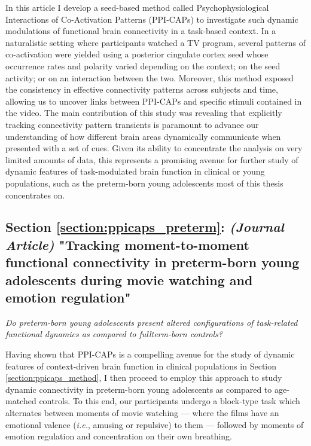 In this article I develop a seed-based method called Psychophysiological Interactions of Co-Activation Patterns (PPI-CAPs) to investigate such dynamic modulations of functional brain connectivity in a task-based context. In a naturalistic setting where participants watched a TV program, several patterns of co-activation were yielded using a posterior cingulate cortex seed whose occurrence rates and polarity varied depending on the context; on the seed activity; or on an interaction between the two. Moreover, this method exposed the consistency in effective connectivity patterns across subjects and time, allowing us to uncover links between PPI-CAPs and specific stimuli contained in the video. The main contribution of this study was revealing that explicitly tracking connectivity pattern transients is paramount to advance our understanding of how different brain areas dynamically communicate when presented with a set of cues. Given its ability to concentrate the analysis on very limited amounts of data, this represents a promising avenue for further study of dynamic features of task-modulated brain function in clinical or young populations, such as the preterm-born young adolescents most of this thesis concentrates on. 


\subsection*{Section \ref{section:ppicaps_preterm}: \textit{(Journal Article)} "Tracking moment-to-moment functional connectivity in preterm-born young adolescents during movie watching and emotion regulation"}
\textit{Do preterm-born young adolescents present altered configurations of task-related functional dynamics as compared to fullterm-born controls?}

Having shown that PPI-CAPs is a compelling avenue for the study of dynamic features of context-driven brain function in clinical populations \citep{Freitas2020} in Section \ref{section:ppicaps_method}, I then proceed to employ this approach to study dynamic connectivity in preterm-born young adolescents as compared to age-matched controls. To this end, our participants undergo a block-type task which alternates between moments of movie watching --- where the films have an emotional valence (\textit{i.e.}, amusing or repulsive) to them ---  followed by moments of emotion regulation and concentration on their own breathing. 